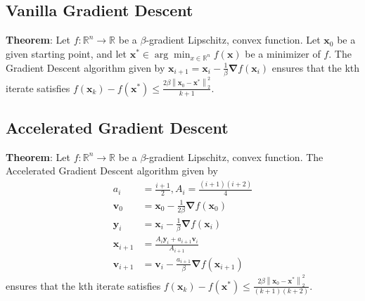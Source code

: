 \subsection{Vanilla Gradient Descent}
\textbf{Theorem}: Let $f: \mathbb{R}^{n} \rightarrow \mathbb{R}$ be a $\beta$-gradient Lipschitz, convex function. Let $\boldsymbol{x}_{0}$ be a given starting point, and let $\boldsymbol{x}^{*} \in \arg \min _{x \in \mathbb{R}^{n}} f(\boldsymbol{x})$ be a minimizer of $f$. The Gradient Descent algorithm given by
$
\boldsymbol{x}_{i+1}=\boldsymbol{x}_{i}-\frac{1}{\beta} \boldsymbol{\nabla} f\left(\boldsymbol{x}_{i}\right)
$
ensures that the kth iterate satisfies
$
f\left(\boldsymbol{x}_{k}\right)-f\left(\boldsymbol{x}^{*}\right) \leq \frac{2 \beta\left\|\boldsymbol{x}_{0}-\boldsymbol{x}^{*}\right\|_{2}^{2}}{k+1} .
$

\subsection{Accelerated Gradient Descent}
\textbf{Theorem}: Let $f: \mathbb{R}^{n} \rightarrow \mathbb{R}$ be a $\beta$-gradient Lipschitz, convex function. 
The Accelerated Gradient Descent algorithm given by
$$
\begin{aligned}
a_{i} &=\frac{i+1}{2}, A_{i}=\frac{(i+1)(i+2)}{4} \\
\boldsymbol{v}_{0} &=\boldsymbol{x}_{0}-\frac{1}{2 \beta} \boldsymbol{\nabla} f\left(\boldsymbol{x}_{0}\right) \\
\boldsymbol{y}_{i} &=\boldsymbol{x}_{i}-\frac{1}{\beta} \boldsymbol{\nabla} f\left(\boldsymbol{x}_{i}\right) \\
\boldsymbol{x}_{i+1} &=\frac{A_{i} \boldsymbol{y}_{i}+a_{i+1} \boldsymbol{v}_{i}}{A_{i+1}} \\
\boldsymbol{v}_{i+1} &=\boldsymbol{v}_{i}-\frac{a_{i+1}}{\beta} \boldsymbol{\nabla} f\left(\boldsymbol{x}_{i+1}\right)
\end{aligned}
$$
ensures that the kth iterate satisfies
$
f\left(\boldsymbol{x}_{k}\right)-f\left(\boldsymbol{x}^{*}\right) \leq \frac{2 \beta\left\|\boldsymbol{x}_{0}-\boldsymbol{x}^{*}\right\|_{2}^{2}}{(k+1)(k+2)} .
$

